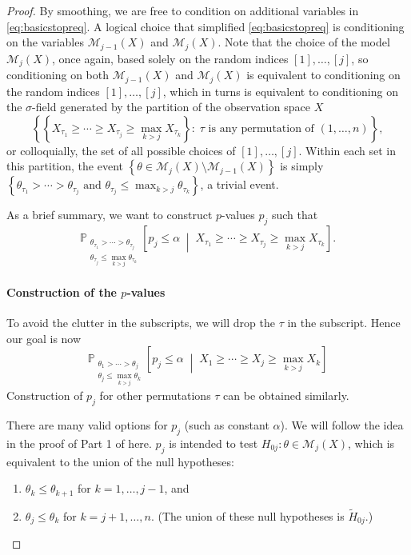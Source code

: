\documentclass[aos, authoryear]{imsart}
\theoremstyle{definition}
\theoremstyle{custom}
\newcommand{\PP}{\mathbb{P}}
\begin{document}
\begin{proof}
By smoothing, we are free to condition on additional variables in \eqref{eq:basicstopreq}. A logical choice that simplified \eqref{eq:basicstopreq} is conditioning on the variables $\mathcal{M}_{j-1}\left(X\right)$ and $\mathcal{M}_j\left(X\right)$. Note that the choice of the model $\mathcal{M}_j\left(X\right)$, once again, based solely on the random indices $[1], \ldots, [j]$, so conditioning on both $\mathcal{M}_{j-1}\left(X\right)$ and $\mathcal{M}_j\left(X\right)$ is equivalent to conditioning on the random indices $[1], \ldots, [j]$, which in turns is equivalent to conditioning on the $\sigma$-field generated by the partition of the observation space $X$
\[\left\{\left\{X_{\tau_1} \ge \cdots \ge X_{\tau_j} \ge \max_{k>j} X_{\tau_k}\right\}:\; \tau \text{ is any permutation of } \left(1, \ldots, n\right)\right\},\]
or colloquially, the set of all possible choices of $[1], \ldots, [j]$. Within each set in this partition, the event $\left\{\theta \in \mathcal{M}_j\left(X\right) \setminus \mathcal{M}_{j-1}\left(X\right)\right\}$ is simply $\left\{\theta_{\tau_1} > \cdots > \theta_{\tau_j} \text { and } \theta_{\tau_j} \le \max_{k>j} \theta_{\tau_k}\right\}$, a trivial event.

As a brief summary, we want to construct $p$-values $p_j$ such that
\[\PP_{\substack{\theta_{\tau_1} > \cdots > \theta_{\tau_j} \\ \theta_{\tau_j} \le \max_{k>j} \theta_{\tau_k}}} \left[p_j \le \alpha \;\middle|\; X_{\tau_1} \ge \cdots \ge X_{\tau_j} \ge \max_{k>j} X_{\tau_k}\right].\]

\paragraph{Construction of the $p$-values}

To avoid the clutter in the subscripts, we will drop the $\tau$ in the subscript. Hence our goal is now
\[\PP_{\substack{\theta_1 > \cdots > \theta_j \\ \theta_j \le \max_{k>j} \theta_k}} \left[p_j \le \alpha \;\middle|\; X_1 \ge \cdots \ge X_j \ge \max_{k>j} X_k\right]\]
Construction of $p_j$ for other permutations $\tau$ can be obtained similarly.

There are many valid options for $p_j$ (such as constant $\alpha$). We will follow the idea in the proof of Part 1 of  here. $p_j$ is intended to test $H_{0j}: \theta \in \mathcal{M}_j\left(X\right)$, which is equivalent to the union of the null hypotheses:
\begin{enumerate}
\item $\theta_k \le \theta_{k+1}$ for $k = 1, \ldots, j-1$, and
\item $\theta_j \le \theta_k$ for $k = j+1, \ldots, n$. (The union of these null hypotheses is $\widetilde{H}_{0j}$.)
\end{enumerate}


\end{proof}
\end{document}
